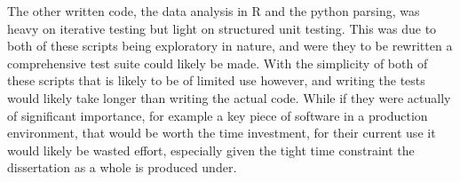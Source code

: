 \documentclass[journal]{IEEEtran}
\begin{document}
    The other written code, the data analysis in R and the python parsing, was heavy on iterative testing but light on structured unit testing. This was due to both of these scripts being exploratory in nature, and were they to be rewritten a comprehensive test suite could likely be made. With the simplicity of both of these scripts that is likely to be of limited use however, and writing the tests would likely take longer than writing the actual code. While if they were actually of significant importance, for example a key piece of software in a production environment, that would be worth the time investment, for their current use it would likely be wasted effort, especially given the tight time constraint the dissertation as a whole is produced under.



\end{document}
